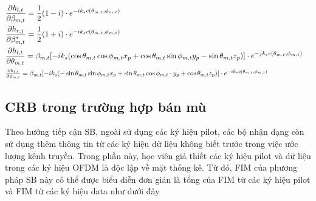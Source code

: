 \begin{subequations}
\label{eq:15}
    \begin{align}
    &\frac{\partial h_{l, t}}{\partial \beta_{m, t}}= \frac{1}{2} (1 - i) \cdot e^{-i k_s c(\theta_{m, t}, \phi_{m, t})} &  \\
    &\frac{\partial h_{r, j}}{\partial \beta^*_{m, t}}= \frac{1}{2} (1 + i) \cdot e^{-i k_s c(\theta_{m, t}, \phi_{m, t})} \\
    &\frac{\partial h_{l, t}}{\partial \theta_{m, t}}=
    \beta_{m, t} 
    [-i k_s (\cos\theta_{m, t} \cos\phi_{m, t} x_p + \cos\theta_{m, t} \sin\phi_{m, t} y_p
    - \sin \theta_{m, t} z_p)] \cdot e^{-j k_s c(\theta_{m, t}, \phi_{m, t})} \\ 
    &
    \resizebox{\textwidth}{!}{$\frac{\partial h_{l, t}}{\partial \phi_{m, t}}=\beta_{m, t}
     [-i k_s (-\sin\theta_{m, t} \sin\phi_{m, t} x_p + \sin\theta_{m, t} \cos\phi_{m, t} \cdot y_p 
    + \cos \theta_{m, t} z_p)] \cdot e^{-i k_s c(\theta_{m, t}, \phi_{m, t})}$ 
    }
    \end{align}
\end{subequations}

\subsection{CRB trong trường hợp bán mù}

Theo hướng tiếp cận SB, ngoài sử dụng các ký hiệu pilot, các bộ nhận dạng còn sử dụng thêm thông tin từ các ký hiệu dữ liệu không biết trước trong việc ước lượng kênh truyền. Trong phần này, học viên giả thiết các ký hiệu pilot và dữ liệu trong các ký hiệu OFDM là độc lập về mặt thống kê. Từ đó, FIM của phương pháp SB này có thể được biểu diễn đơn giản là tổng của FIM từ các ký hiệu pilot và FIM từ các ký hiệu data như dưới đây


